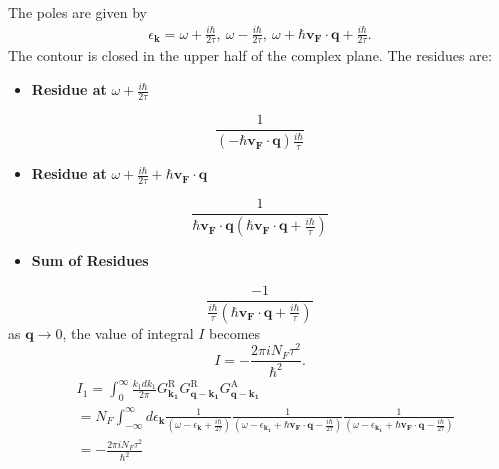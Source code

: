 \documentclass[aps,prb,amsmath,amssymb,footinbib,showpacs,twocolumn]{revtex4-2}
\begin{document}
\begin{widetext}
\begin{align}
     \end{align}
The poles are given by
\begin{align}
  \epsilon_{\mathbf{k}}= \omega+ \frac{i\hbar}{2\tau},\ \omega- \frac{i\hbar}{2\tau}, \ \omega+\hbar\mathbf{v_{F}\cdot q}+\frac{i\hbar}{2\tau}.
\end{align}
The contour is closed in the upper half of the complex plane. The residues are: 
\begin{itemize}
    \item \textbf{Residue at} $\omega+ \frac{i\hbar}{2\tau}$
    \end{itemize}
  \begin{equation}
      \frac{1}{(-\hbar\mathbf{v_{F}\cdot q})\frac{i\hbar}{\tau}}
  \end{equation}
\begin{itemize}
    \item \textbf{Residue at} $\omega+ \frac{i\hbar}{2\tau}+\hbar\mathbf{v_{F}\cdot q}$
    \end{itemize}
    \begin{equation}
        \frac{1}{\hbar\mathbf{v_{F}\cdot q}(\hbar\mathbf{v_{F} \cdot q}+\frac{i\hbar}{\tau})}
    \end{equation}
  \begin{itemize}
    \item \textbf{ Sum of Residues } 
    \end{itemize}  
     \begin{equation}
        \frac{-1}{\frac{i\hbar}{\tau}(\hbar\mathbf{v_{F}\cdot q}+\frac{i\hbar}{\tau})}
    \end{equation}
    as $\mathbf{q}\to 0$, the value of integral $I$ becomes
    \begin{equation}
        I= -\frac{2\pi i N_{F}\tau^{2}}{\hbar^{2}}.
    \end{equation}
\begin{align}
   &I_{1}= \int_{0}^{\infty}\frac{k_{1}dk_{1}}{2\pi}G_{\mathbf{k_1}}^{\mathrm{R}}G_{\mathbf{q-k_1}}^{\mathrm{R}} G_{\mathbf{q-k_1}}^{\mathrm{A}} \nonumber\\
        &=   N_{F}\int_{-\infty}^{\infty}d\epsilon_{\mathbf{k}} \frac{1}{(\omega-\epsilon_{\mathbf{k}}+\frac{i\hbar}{2\tau})}\frac{1}{(\omega-\epsilon_{\mathbf{k_{1}}}+\hbar\mathbf{v_{F}\cdot q}-\frac{i\hbar}{2\tau})}\frac{1}{(\omega-\epsilon_{\mathbf{k_{1}}}+\hbar\mathbf{v_{F}\cdot q}-\frac{i\hbar}{2\tau})}\nonumber\\
        &= -\frac{2\pi i N_{F}\tau^{2}}{\hbar^{2}}
\end{align}

\end{widetext}
\end{document}
